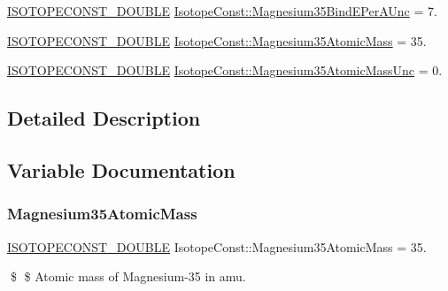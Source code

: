 \begin{DoxyCompactItemize}
\mbox{\hyperlink{group___isotope_const-_macros_ga8f45a7272ce02c0b4c65c44636ed719a}{I\+S\+O\+T\+O\+P\+E\+C\+O\+N\+S\+T\+\_\+\+D\+O\+U\+B\+LE}} \mbox{\hyperlink{group___isotope_const-_magnesium-_mg35_ga29e317b743d4bfcc427283ab18474f7c}{Isotope\+Const\+::\+Magnesium35\+Bind\+E\+Per\+A\+Unc}} = 7.
\item 
\mbox{\hyperlink{group___isotope_const-_macros_ga8f45a7272ce02c0b4c65c44636ed719a}{I\+S\+O\+T\+O\+P\+E\+C\+O\+N\+S\+T\+\_\+\+D\+O\+U\+B\+LE}} \mbox{\hyperlink{group___isotope_const-_magnesium-_mg35_ga5f9deccd2ef6e4005f80e46f70247499}{Isotope\+Const\+::\+Magnesium35\+Atomic\+Mass}} = 35.
\item 
\mbox{\hyperlink{group___isotope_const-_macros_ga8f45a7272ce02c0b4c65c44636ed719a}{I\+S\+O\+T\+O\+P\+E\+C\+O\+N\+S\+T\+\_\+\+D\+O\+U\+B\+LE}} \mbox{\hyperlink{group___isotope_const-_magnesium-_mg35_ga6910bdc20f86848389016fd9c454cca9}{Isotope\+Const\+::\+Magnesium35\+Atomic\+Mass\+Unc}} = 0.
\end{DoxyCompactItemize}


\subsection{Detailed Description}


\subsection{Variable Documentation}
\mbox{\label{group___isotope_const-_magnesium-_mg35_ga5f9deccd2ef6e4005f80e46f70247499}} 
\subsubsection{\texorpdfstring{Magnesium35\+Atomic\+Mass}{Magnesium35AtomicMass}}
{\footnotesize\ttfamily \mbox{\hyperlink{group___isotope_const-_macros_ga8f45a7272ce02c0b4c65c44636ed719a}{I\+S\+O\+T\+O\+P\+E\+C\+O\+N\+S\+T\+\_\+\+D\+O\+U\+B\+LE}} Isotope\+Const\+::\+Magnesium35\+Atomic\+Mass = 35.}

\$ \$ Atomic mass of Magnesium-\/35 in amu. \mbox{\label{group___isotope_const-_magnesium-_mg35_ga6910bdc20f86848389016fd9c454cca9}} 
